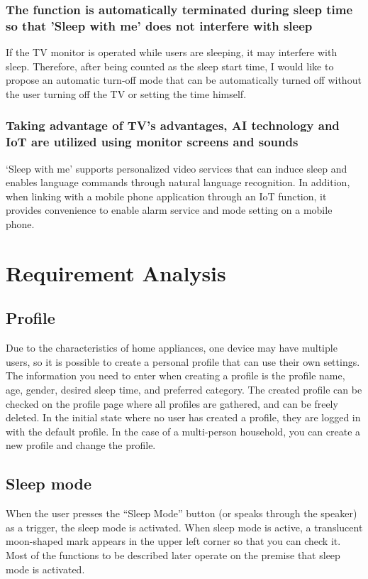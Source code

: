 \documentclass[conference]{IEEEtran}
\begin{document}
\subsubsection{The function is automatically terminated during sleep time so that 'Sleep with me' does not interfere with sleep}
If the TV monitor is operated while users are sleeping, it may interfere with sleep. Therefore, after being counted as the sleep start time, I would like to propose an automatic turn-off mode that can be automatically turned off without the user turning off the TV or setting the time himself.
\vspace{1\baselineskip}
\subsubsection{Taking advantage of TV's advantages, AI technology and IoT are utilized using monitor screens and sounds}
‘Sleep with me’ supports personalized video services that can induce sleep and enables language commands through natural language recognition. In addition, when linking with a mobile phone application through an IoT function, it provides convenience to enable alarm service and mode setting on a mobile phone.

\vspace{2\baselineskip}
\section{Requirement Analysis}
\vspace{1\baselineskip}
\subsection{Profile}
Due to the characteristics of home appliances, one device may have multiple users, so it is possible to create a personal profile that can use their own settings. The information you need to enter when creating a profile is the profile name, age, gender, desired sleep time, and preferred category. The created profile can be checked on the profile page where all profiles are gathered, and can be freely deleted. In the initial state where no user has created a profile, they are logged in with the default profile. In the case of a multi-person household, you can create a new profile and change the profile.
\vspace{1\baselineskip}
\subsection{Sleep mode}
When the user presses the “Sleep Mode” button (or speaks through the speaker) as a trigger, the sleep mode is activated. When sleep mode is active, a translucent moon-shaped mark appears in the upper left corner so that you can check it. Most of the functions to be described later operate on the premise that sleep mode is activated.
\vspace{1\baselineskip}
\end{document}
